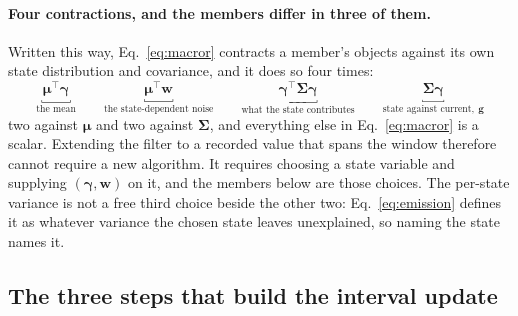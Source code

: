 \begin{appendixbox}
\paragraph{Four contractions, and the members differ in three of them.}
Written this way, Eq.~\ref{eq:macror} contracts a member's objects against its own state
distribution and covariance, and it does so four times:
\[
  \underbracket{\boldsymbol{\mu}^\top\boldsymbol{\gamma}}_{\text{the mean}}
  \qquad
  \underbracket{\boldsymbol{\mu}^\top\mathbf{w}}_{\text{the state-dependent noise}}
  \qquad
  \underbracket{\boldsymbol{\gamma}^\top\boldsymbol{\Sigma}\boldsymbol{\gamma}}_{\text{what the state contributes}}
  \qquad
  \underbracket{\boldsymbol{\Sigma}\boldsymbol{\gamma}}_{\text{state against current},\ \mathbf{g}}
\]
two against $\boldsymbol{\mu}$ and two against $\boldsymbol{\Sigma}$, and everything else in Eq.~\ref{eq:macror} is
a scalar. Extending the filter to a recorded value that spans the window therefore cannot require a
new algorithm. It requires choosing a state variable and supplying $(\boldsymbol{\gamma},\mathbf{w})$ on
it, and the members below are those choices. The per-state variance is not a free third choice
beside the other two: Eq.~\ref{eq:emission} defines it as whatever variance the chosen state leaves
unexplained, so naming the state names it.

\subsection*{The three steps that build the interval update}


\end{appendixbox}
